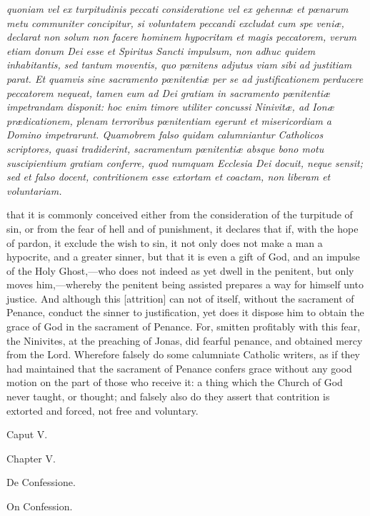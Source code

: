 \emph{quoniam vel ex turpitudinis peccati consideratione vel ex gehennæ et pœnarum metu communiter concipitur, si voluntatem peccandi excludat cum spe veniæ, declarat non solum non facere hominem hypocritam et magis peccatorem, verum etiam donum Dei esse et Spiritus Sancti impulsum, non adhuc quidem inhabitantis, sed tantum moventis, quo pœnitens adjutus viam sibi ad justitiam parat. Et quamvis sine sacramento pœnitentiæ per se ad justificationem perducere peccatorem nequeat, tamen eum ad Dei gratiam in sacramento pœnitentiæ impetrandam disponit: hoc enim timore utiliter concussi Ninivitæ, ad Ionæ prædicationem, plenam terroribus pœnitentiam egerunt et misericordiam a Domino impetrarunt. Quamobrem falso quidam calumniantur Catholicos scriptores, quasi tradiderint, sacramentum pœnitentiæ absque bono motu suscipientium gratiam conferre, quod numquam Ecclesia Dei docuit, neque sensit; sed et falso docent, contritionem esse extortam et coactam, non liberam et voluntariam.}

that it is commonly conceived either from the consideration of the turpitude of sin, or from the fear of hell and of punishment, it declares that if, with the hope of pardon, it exclude the wish to sin, it not only does not make a man a hypocrite, and a greater sinner, but that it is even a gift of God, and an impulse of the Holy Ghost,—who does not indeed as yet dwell in the penitent, but only moves him,—whereby the penitent being assisted prepares a way for himself unto justice. And although this [attrition] can not of itself, without the sacrament of Penance, conduct the sinner to justification, yet does it dispose him to obtain the grace of God in the sacrament of Penance. For, smitten profitably with this fear, the Ninivites, at the preaching of Jonas, did fearful penance, and obtained mercy from the Lord. Wherefore falsely do some calumniate Catholic writers, as if they had maintained that the sacrament of Penance confers grace without any good motion on the part of those who receive it: a thing which the Church of God never taught, or thought; and falsely also do they assert that contrition is extorted and forced, not free and voluntary.

Caput V.

Chapter V.

De Confessione.

On Confession.

